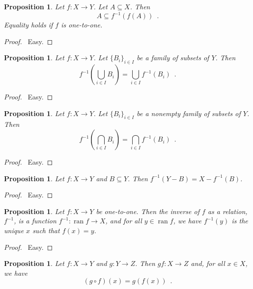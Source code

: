 \documentclass{report}
\let\qed\relax
\newtheorem{prop}[ax]{Proposition}
\theoremstyle{definition}
\newcommand{\ran}{\ensuremath{\operatorname{ran}}}
\begin{document}
\begin{prop}
Let $f : X \rightarrow Y$. Let $A \subseteq X$. Then
\[ A \subseteq f^{-1}(f(A)) \enspace . \]
Equality holds if $f$ is one-to-one.
\end{prop}

\begin{proof}
\pf\ Easy. \qed
\end{proof}

\begin{prop}
Let $f : X \rightarrow Y$. Let $\{B_i\}_{i \in I}$ be a family of subsets of $Y$. Then
\[ f^{-1} \left( \bigcup_{i \in I} B_i \right) = \bigcup_{i \in I} f^{-1}(B_i) \enspace . \]
\end{prop}

\begin{proof}
\pf\ Easy. \qed
\end{proof}

\begin{prop}
Let $f : X \rightarrow Y$. Let $\{B_i\}_{i \in I}$ be a nonempty family of subsets of $Y$. Then
\[ f^{-1} \left( \bigcap_{i \in I} B_i \right) = \bigcap_{i \in I} f^{-1}(B_i) \enspace . \]
\end{prop}

\begin{proof}
\pf\ Easy. \qed
\end{proof}

\begin{prop}
Let $f : X \rightarrow Y$ and $B \subseteq Y$. Then $f^{-1}(Y - B) = X - f^{-1}(B)$.
\end{prop}

\begin{proof}
\pf\ Easy. \qed
\end{proof}

\begin{prop}
Let $f : X \rightarrow Y$ be one-to-one. Then the inverse of $f$ as a relation, $f^{-1}$, is a function $f^{-1} : \ran f \rightarrow X$, and for all $y \in \ran f$, we have $f^{-1}(y)$ is the unique $x$ such that $f(x) = y$.
\end{prop}

\begin{proof}
\pf\ Easy. \qed
\end{proof}

\begin{prop}
Let $f : X \rightarrow Y$ and $g : Y \rightarrow Z$. Then $g f : X \rightarrow Z$ and, for all $x \in X$, we have
\[ (g \circ f)(x) = g(f(x)) \enspace . \]
\end{prop}
\end{document}
